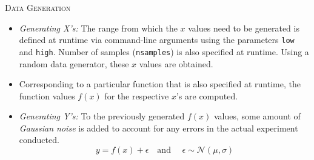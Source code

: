 \documentclass[a4paper,12pt]{article}
\begin{document}
\noindent \textsc{Data Generation} 
\begin{itemize}
\item \textit{Generating X's:} The range from which the $x$ values need to be generated is defined at runtime via command-line arguments using the parameters \texttt{low} and \texttt{high}. Number of samples (\texttt{nsamples}) is also specified at runtime. Using a random data generator, these $x$ values are obtained. 

\item Corresponding to a particular function that is also specified at runtime, the function values $f(x)$ for the respective $x$'s are computed.

\item \textit{Generating Y's:} To the previously generated $f(x)$ values, some amount of \textit{Gaussian noise} is added to account for any errors in the actual experiment conducted. 
\[ y = f(x) + \epsilon \quad \textrm{and } \quad \epsilon \sim \mathcal{N}(\mu,\sigma) \]



\end{itemize}
\end{document}
